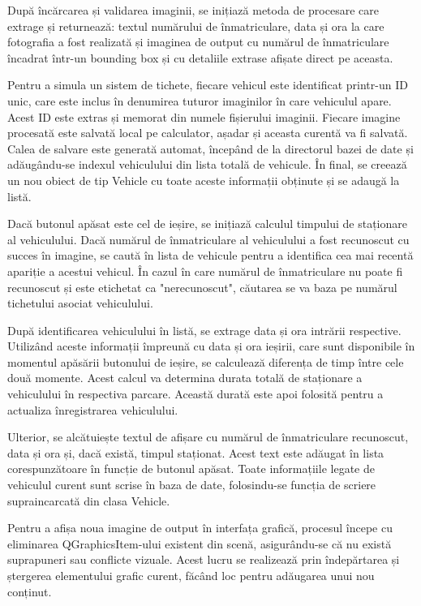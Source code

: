 \documentclass[a4paper,12pt]{report}
\begin{document}
După încărcarea și validarea imaginii, se inițiază metoda de procesare care extrage și returnează: textul numărului de înmatriculare, data și ora la care fotografia a fost realizată și imaginea de output cu numărul de înmatriculare încadrat într-un bounding box și cu detaliile extrase afișate direct pe aceasta.

Pentru a simula un sistem de tichete, fiecare vehicul este identificat printr-un ID unic, care este inclus în denumirea tuturor imaginilor în care vehiculul apare. Acest ID este extras și memorat din numele fișierului imaginii. Fiecare imagine procesată este salvată local pe calculator, așadar și aceasta curentă va fi salvată. Calea de salvare este generată automat, începând de la directorul bazei de date și adăugându-se indexul vehiculului din lista totală de vehicule. În final, se creează un nou obiect de tip Vehicle cu toate aceste informații obținute și se adaugă la listă.

Dacă butonul apăsat este cel de ieșire, se inițiază calculul timpului de staționare al vehiculului. Dacă numărul de înmatriculare al vehiculului a fost recunoscut cu succes în imagine, se caută în lista de vehicule pentru a identifica cea mai recentă apariție a acestui vehicul. În cazul în care numărul de înmatriculare nu poate fi recunoscut și este etichetat ca "nerecunoscut", căutarea se va baza pe numărul tichetului asociat vehiculului.

După identificarea vehiculului în listă, se extrage data și ora intrării respective. Utilizând aceste informații împreună cu data și ora ieșirii, care sunt disponibile în momentul apăsării butonului de ieșire, se calculează diferența de timp între cele două momente. Acest calcul va determina durata totală de staționare a vehiculului în respectiva parcare. Această durată este apoi folosită pentru a actualiza înregistrarea vehiculului.

Ulterior, se alcătuiește textul de afișare cu numărul de înmatriculare recunoscut, data și ora și, dacă există, timpul staționat. Acest text este adăugat în lista corespunzătoare în funcție de butonul apăsat. Toate informațiile legate de vehiculul curent sunt scrise în baza de date, folosindu-se funcția de scriere supraincarcată din clasa Vehicle.

Pentru a afișa noua imagine de output în interfața grafică, procesul începe cu eliminarea QGraphicsItem-ului existent din scenă, asigurându-se că nu există suprapuneri sau conflicte vizuale. Acest lucru se realizează prin îndepărtarea și ștergerea elementului grafic curent, făcând loc pentru adăugarea unui nou conținut.
\end{document}
